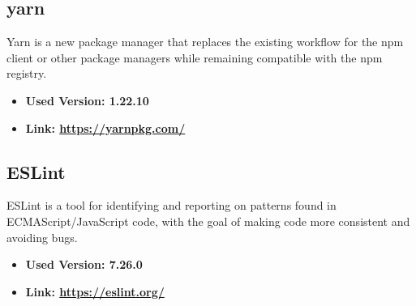 \subsection{yarn}
Yarn is a new package manager that replaces the existing workflow for the npm client or other package managers while
remaining compatible with the npm registry.
\begin{itemize}
  \item \textbf{Used Version: 1.22.10}
  \item \textbf{Link: \url{https://yarnpkg.com/}}
\end{itemize}
\subsection{ESLint}
ESLint is a tool for identifying and reporting on patterns found in ECMAScript/JavaScript code, with the goal of making code more consistent and avoiding bugs. 
\begin{itemize}
  \item \textbf{Used Version: 7.26.0}
  \item \textbf{Link: \url{https://eslint.org/}}
\end{itemize}